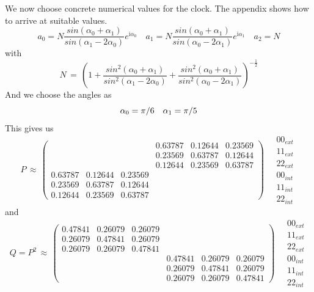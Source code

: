 \documentclass[12pt]{article}
\begin{document}
We now choose concrete numerical values for the clock. The appendix shows how to arrive at suitable values.
\begin{equation*}
a_0=N\frac{sin(\alpha_0+\alpha_1)}{sin(\alpha_1-2\alpha_0)}e^{\mathrm{i}\alpha_0} \quad
a_1=N\frac{sin(\alpha_0+\alpha_1)}{sin(\alpha_0-2\alpha_1)}e^{\mathrm{i}\alpha_1} \quad
a_2=N
\end{equation*}
with 
\begin{equation*}
N\, = \, \left( 1 +
\frac{sin^2(\alpha_0+\alpha_1)}{sin^2(\alpha_1-2\alpha_0)} +
\frac{sin^2(\alpha_0+\alpha_1)}{sin^2(\alpha_0-2\alpha_1)} \right)^{-\frac{1}{2}}
\end{equation*}
And we choose the angles as
\begin{equation*}
\alpha_0 = \pi / 6 \quad \alpha_1 = \pi / 5 \\ \\
\end{equation*}
This gives us
\begin{equation*}
P\, \approx\,
\begin{pmatrix}
   &&& 0.63787 &  0.12644 &  0.23569 \\
   &&& 0.23569 &  0.63787 &  0.12644 \\
   &&& 0.12644 &  0.23569 &  0.63787 \\
   0.63787 &  0.12644 &  0.23569 &&& \\
   0.23569 &  0.63787 &  0.12644 &&& \\
   0.12644 &  0.23569 &  0.63787 &&& 
\end{pmatrix}
\quad
\begin{matrix}
00_{ext} \\ 11_{ext} \\ 22_{ext} \\ 00_{int} \\ 11_{int} \\ 22_{int}
\end{matrix}
\end{equation*}
and
\begin{equation*}
Q=P^2\, \approx\,
\begin{pmatrix}
   0.47841 & 0.26079 & 0.26079 &&& \\
   0.26079 & 0.47841 & 0.26079 &&& \\
   0.26079 & 0.26079 & 0.47841 &&& \\
   &&& 0.47841 & 0.26079 & 0.26079 \\
   &&& 0.26079 & 0.47841 & 0.26079 \\
   &&& 0.26079 & 0.26079 & 0.47841
\end{pmatrix}
\quad
\begin{matrix}
00_{ext} \\ 11_{ext} \\ 22_{ext} \\ 00_{int} \\ 11_{int} \\ 22_{int}
\end{matrix}
\end{equation*}
\end{document}
